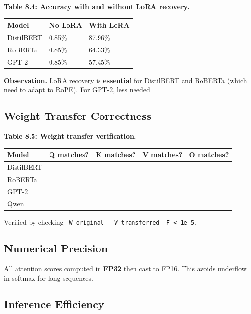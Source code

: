 \textbf{Table 8.4: Accuracy with and without LoRA recovery.}

\begin{table}[H]
\centering
\small
\begin{tabular}{lll}
\toprule
\textbf{Model} & \textbf{No LoRA} & \textbf{With LoRA} \\
\midrule
DistilBERT & 0.85\% & 87.96\% \\
RoBERTa & 0.85\% & 64.33\% \\
GPT-2 & 0.85\% & 57.45\% \\
\bottomrule
\end{tabular}
\end{table}

\textbf{Observation.} LoRA recovery is \textbf{essential} for DistilBERT and 
RoBERTa (which need to adapt to RoPE). For GPT-2, less needed.

\subsection{Weight Transfer Correctness}

\textbf{Table 8.5: Weight transfer verification.}

\begin{table}[H]
\centering
\small
\begin{tabular}{lllll}
\toprule
\textbf{Model} & \textbf{Q matches?} & \textbf{K matches?} & \textbf{V matches?} & \textbf{O matches?} \\
\midrule
DistilBERT &  &  &  &  \\
RoBERTa &  &  &  &  \\
GPT-2 &  &  &  &  \\
Qwen &  &  &  &  \\
\bottomrule
\end{tabular}
\end{table}

Verified by checking \texttt{ W\_original - W\_transferred \_F \textless{} 1e-5}.

\subsection{Numerical Precision}

All attention scores computed in \textbf{FP32} then cast to FP16. This avoids 
underflow in softmax for long sequences.

\subsection{Inference Efficiency}

